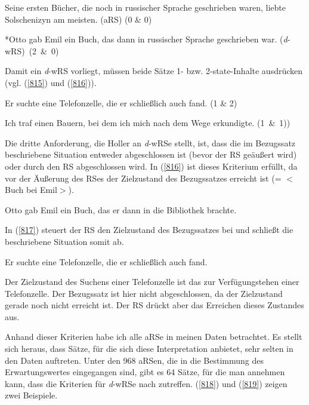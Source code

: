 \begin{exe}
	\ex\label{813} 
	Seine ersten Bücher, die noch in russischer Sprache geschrieben waren, liebte Solschenizyn am meisten. (aRS) (0 \& 0)
\end{exe} 	
\vspace{-0.65cm}
\begin{exe}
	\ex\label{814} 
	*Otto gab Emil ein Buch, das dann in russischer Sprache geschrieben war. 
	\newline
	\hbox{}\hfill\hbox{(\textit{d}-wRS) (2 \& 0)}	
	\newline
	\hbox{}\hfill\hbox{\citet[160]{Holler2005}}
\end{exe}
Damit ein \textit{d}-wRS vorliegt, müssen beide Sätze 1- bzw. 2-state-Inhalte ausdrücken (vgl. (\ref{815}) und (\ref{816})).

\begin{exe}
	\ex\label{815} 
	Er suchte eine Telefonzelle, die er schließlich auch fand. (1 \& 2)
\end{exe} 	
\vspace{-0.65cm}
\begin{exe}
	\ex\label{815} 
	Ich traf einen Bauern, bei dem ich mich nach dem Wege erkundigte. 
	\newline
	\hbox{}\hfill\hbox{(1 \& 1))}	
\end{exe} 
Die dritte Anforderung, die Holler an \textit{d}-wRSe stellt, ist, dass die im Bezugssatz beschriebene Situation entweder abgeschlossen ist (bevor der RS geäußert wird) oder durch den RS abgeschlossen wird. In (\ref{816}) ist dieses Kriterium erfüllt, da vor der Äußerung des RSes der Zielzustand des Bezugssatzes erreicht ist (= $<$Buch bei Emil$>$).

\begin{exe}
	\ex\label{816} 
	Otto gab Emil ein Buch, das er dann in die Bibliothek brachte.
\end{exe} 
In (\ref{817}) steuert der RS den Zielzustand des Bezugssatzes bei und schließt die beschriebene Situation somit ab.

\begin{exe}
	\ex\label{817} 
	Er suchte eine Telefonzelle, die er schließlich auch fand.
\end{exe} 
Der Zielzustand des Suchens einer Telefonzelle ist das zur Verfügungstehen einer Telefonzelle. Der Bezugssatz ist hier nicht abgeschlossen, da der Zielzustand ge\-rade noch nicht erreicht ist. Der RS drückt aber das Erreichen dieses Zustandes aus.

Anhand dieser Kriterien habe ich alle aRSe in meinen Daten betrachtet. Es stellt sich heraus, dass Sätze, für die sich diese Interpretation anbietet, sehr selten in den Daten auftreten. Unter den 968 aRSen, die in die Bestimmung des Erwartungswertes eingegangen sind, gibt es 64 Sätze, für die man annehmen kann, dass die Kriterien für \textit{d}-wRSe nach \citet{Holler2005} zutreffen. (\ref{818}) und (\ref{819}) zeigen zwei Beispiele.

